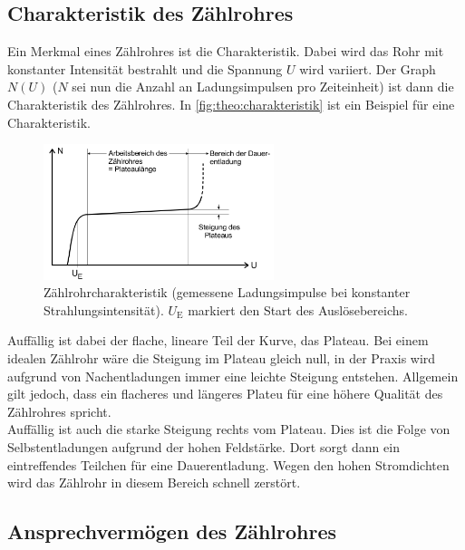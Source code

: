 \subsection{Charakteristik des Zählrohres}
\label{sec:theo:charakteristik}

Ein Merkmal eines Zählrohres ist die Charakteristik. Dabei wird das Rohr mit konstanter Intensität bestrahlt und
die Spannung $U$ wird variiert. Der Graph $N(U)$ ($N$ sei nun die Anzahl an Ladungsimpulsen pro Zeiteinheit) ist dann
die Charakteristik des Zählrohres. In
\autoref{fig:theo:charakteristik} ist ein Beispiel für eine Charakteristik.
\begin{figure}[H]
	\centering
	\includegraphics[width=0.6\textwidth]{content/charakteristik.png}
	\caption{Zählrohrcharakteristik (gemessene Ladungsimpulse bei konstanter Strahlungsintensität). $U_\text{E}$
	markiert den Start des Auslösebereichs. \cite{sample}}
	\label{fig:theo:charakteristik}
\end{figure}

\noindent
Auffällig ist dabei der flache, lineare Teil der Kurve, das Plateau. Bei einem idealen Zählrohr wäre die Steigung
im Plateau gleich null, in der Praxis wird aufgrund von Nachentladungen immer eine leichte Steigung entstehen. 
Allgemein gilt
jedoch, dass ein flacheres und längeres Plateu für eine höhere Qualität des Zählrohres spricht.
\\
Auffällig ist auch die starke Steigung rechts vom Plateau. Dies ist die Folge von Selbstentladungen aufgrund 
der hohen Feldstärke. Dort sorgt dann ein eintreffendes Teilchen für eine Dauerentladung. Wegen den hohen Stromdichten
wird das Zählrohr in diesem Bereich schnell zerstört.

\subsection{Ansprechvermögen des Zählrohres}
\label{sec:theo:ansprechvermoegen}

